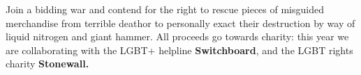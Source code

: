 Join a bidding war and contend for the right to rescue pieces of
misguided merchandise from terrible death\textemdash or to
personally exact their destruction by way of liquid nitrogen and giant
hammer. All proceeds go towards charity: this year we are
collaborating with the LGBT+ helpline
\textbf{Switchboard}, and the LGBT rights charity \textbf{Stonewall.}
